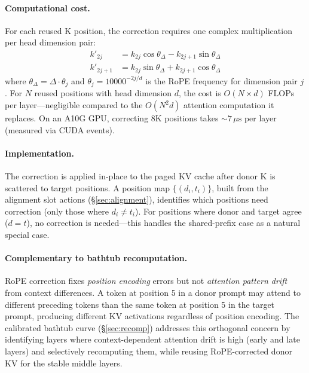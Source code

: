 \documentclass[10pt,twocolumn]{article}
\begin{document}
\paragraph{Computational cost.}
For each reused K position, the correction requires one complex
multiplication per head dimension pair:
\begin{align}
  k'_{2j}   &= k_{2j} \cos\theta_\Delta - k_{2j+1} \sin\theta_\Delta \nonumber \\
  k'_{2j+1} &= k_{2j} \sin\theta_\Delta + k_{2j+1} \cos\theta_\Delta
  \label{eq:rope-complex}
\end{align}
where $\theta_\Delta = \Delta \cdot \theta_j$ and
$\theta_j = 10000^{-2j/d}$ is the RoPE frequency for dimension pair $j$.
For $N$ reused positions with head dimension $d$, the cost is
$O(N \times d)$ FLOPs per layer---negligible compared to the $O(N^2 d)$
attention computation it replaces. On an A10G GPU, correcting 8K positions
takes ${\sim}7\,\mu\text{s}$ per layer (measured via CUDA events).

\paragraph{Implementation.}
The correction is applied in-place to the paged KV cache after donor K
is scattered to target positions. A position map $\{(d_i, t_i)\}$,
built from the alignment slot actions
(\S\ref{sec:alignment}), identifies which positions need correction
(only those where $d_i \neq t_i$). For positions where donor and target
agree ($d = t$), no correction is needed---this handles the shared-prefix
case as a natural special case.

\paragraph{Complementary to bathtub recomputation.}
RoPE correction fixes \emph{position encoding} errors but not
\emph{attention pattern drift} from context differences. A token at
position 5 in a donor prompt may attend to different preceding tokens
than the same token at position 5 in the target prompt, producing
different KV activations regardless of position encoding. The calibrated
bathtub curve (\S\ref{sec:recomp}) addresses this orthogonal concern by
identifying layers where context-dependent attention drift is high
(early and late layers) and selectively recomputing them, while
reusing RoPE-corrected donor KV for the stable middle layers.
\end{document}
